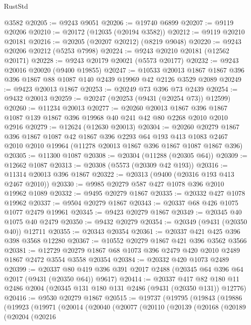 \begin{lexlean}{RustStd}
\begin{coremodule}
    @3582
@20205 := @9243 @9051
@20206 := @19740 @6899
@20207 := @9119 @20206
@20210 := @20172 (@12035 (@20194 @3582))
@20212 := @9119 @20210 @20181
@20216 := @20205 (@20207 @20212) (@8219 @9048)
@20220 := @9243 @20206 @20212 (@5253 @7998)
@20224 := @9243 @20210 @20181 (@12562 @20171)
@20228 := @9243 @20179 @20021 (@5573 @20177)
@20232 := @9243 @20016 @20020 (@9400 @19855)
@20247 := @10533
    @20013
    @1867
    @1867
    @396
    @396
    @1867
    @88
    @1087
    @140
    @2439
    @19969
    @42
    @2126
    @3529
    @2089
@20249 := @9423 @20013 @1867
@20253 := @20249 @73 @396 @73 @2439
@20254 := @9432 @20013
@20259 := @20247 (@20253 (@9431 (@20254 @73)) @12599)
@20260 := @11234 @20013
@20277 := @20260
    @20013
    @1867
    @396
    @1867
    @1087
    @139
    @1867
    @396
    @19968
    @40
    @241
    @42
    @80
    @2268
    @2010
    @2010
    @2916
@20279 := @12624 (@12630 @20013)
@20304 := @20260
    @20279
    @1867
    @396
    @1867
    @1087
    @42
    @1867
    @396
    @2293
    @64
    @193
    @413
    @1083
    @2467
    @2010
    @2010
    @19964
    (@11278 @20013 @1867 @396 @1867 @1087 @1867 @396)
@20305 := @11300 @1087
@20308 := @20304 (@11288 (@20305 @64))
@20309 := @12662 @1087
@20313 := @20308 (@5573 (@20309 @42 @193))
@20316 := @11314 @20013 @396 @1867
@20322 := @20313 (@9400 (@20316 @193 @413 @2467 @2010))
@20330 := @9985 @20279 @587 @427 @1078 @396 @2010 @19962 @1089
@20332 := @9495 @20279 @1867
@20335 := @20332 @427 @1078 @19962
@20337 := @9504 @20279 @1867
@20343 := @20337 @68 @426 @1075 @1077 @2479 @19961
@20345 := @9423 @20279 @1867
@20349 := @20345 @40 @1075 @40 @2479
@20350 := @9432 @20279
@20354 := @20349 (@9431 (@20350 @40)) @12711
@20355 := @20343 @20354
@20361 := @20337 @421 @425 @396 @398 @3568 @12280
@20367 := @10552 @20279 @1867 @421 @396 @3562 @3566
@20381 := @12729 @20279 @1867 @68 @1073 @396 @2479 @420 @2010 @2489 @1867 @2472 @3554 @3558 @20354
@20384 := @20332 @420 @1073 @2489
@20399 := @20337
    @80
    @419
    @396
    @391
    @2017
    @2488
    (@20345 @64 @396 @64 @2017 (@9431 (@20350 @64)) @9617)
@20414 := @20337
    @417
    @82
    @180
    @11
    @2486
    @2004
    (@20345 @131 @180 @131 @2486 (@9431 (@20350 @131)) @12776)
@20416 := @9530 @20279 @1867
@20515 := @19737
    (@19795
      (@19843
        (@19886
          (@19923
            (@19971
              (@20014
                (@20040
                  (@20077
                    (@20110
                      (@20139
                        (@20168
                          (@20189
                            (@20204
                              (@20216

\end{coremodule}
\end{lexlean}
